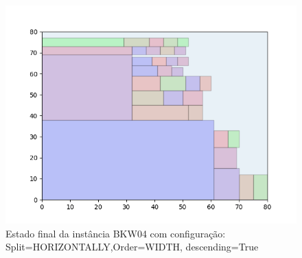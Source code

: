 \begin{figure}[H]
    \centering
    \caption[]{Estado final da instância BKW04 com configuração: Split=HORIZONTALLY,Order=WIDTH, descending=True}
    \label{fig:bkw04-horizontally-width-true}
    \includegraphics[scale=0.5]{output/figures/bkw/bkw04/horizontally/width/true/00}
\end{figure}